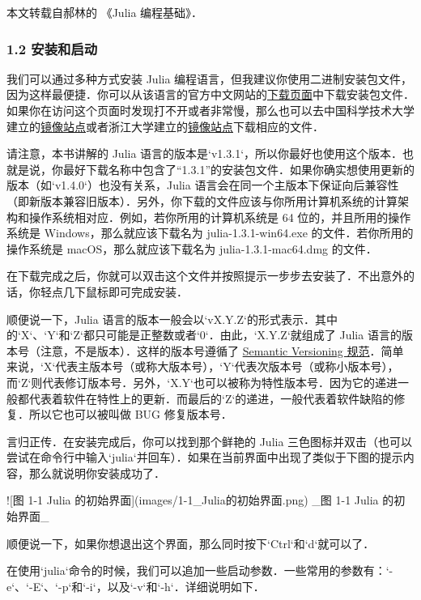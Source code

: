 
本文转载自郝林的 《Julia 编程基础》．

\subsubsection{1.2 安装和启动}

我们可以通过多种方式安装 Julia 编程语言，但我建议你使用二进制安装包文件，因为这样最便捷．你可以从该语言的官方中文网站的\href{https://cn.julialang.org/downloads/}{下载页面}中下载安装包文件．如果你在访问这个页面时发现打不开或者非常慢，那么也可以去中国科学技术大学建立的\href{https://mirrors.zju.edu.cn/julia/releases/}{镜像站点}或者浙江大学建立的\href{https://mirrors.ustc.edu.cn/julia/releases/}{镜像站点}下载相应的文件．

请注意，本书讲解的 Julia 语言的版本是`v1.3.1`，所以你最好也使用这个版本．也就是说，你最好下载名称中包含了“1.3.1”的安装包文件．如果你确实想使用更新的版本（如`v1.4.0`）也没有关系，Julia 语言会在同一个主版本下保证向后兼容性（即新版本兼容旧版本）．另外，你下载的文件应该与你所用计算机系统的计算架构和操作系统相对应．例如，若你所用的计算机系统是 64 位的，并且所用的操作系统是 Windows，那么就应该下载名为 julia-1.3.1-win64.exe 的文件．若你所用的操作系统是 macOS，那么就应该下载名为 julia-1.3.1-mac64.dmg 的文件．

在下载完成之后，你就可以双击这个文件并按照提示一步步去安装了．不出意外的话，你轻点几下鼠标即可完成安装．

顺便说一下，Julia 语言的版本一般会以`vX.Y.Z`的形式表示．其中的`X`、`Y`和`Z`都只可能是正整数或者`0`．由此，`X.Y.Z`就组成了 Julia 语言的版本号（注意，不是版本）．这样的版本号遵循了 \href{https://semver.org}{Semantic Versioning 规范}．简单来说，`X`代表主版本号（或称大版本号），`Y`代表次版本号（或称小版本号），而`Z`则代表修订版本号．另外，`X.Y`也可以被称为特性版本号．因为它的递进一般都代表着软件在特性上的更新．而最后的`Z`的递进，一般代表着软件缺陷的修复．所以它也可以被叫做 BUG 修复版本号．

言归正传．在安装完成后，你可以找到那个鲜艳的 Julia 三色图标并双击（也可以尝试在命令行中输入`julia`并回车）．如果在当前界面中出现了类似于下图的提示内容，那么就说明你安装成功了．

![图 1-1 Julia 的初始界面](images/1-1_Julia的初始界面.png)
_图 1-1 Julia 的初始界面_

顺便说一下，如果你想退出这个界面，那么同时按下`Ctrl`和`d`就可以了．

在使用`julia`命令的时候，我们可以追加一些启动参数．一些常用的参数有：`-e`、`-E`、`-p`和`-i`，以及`-v`和`-h`．详细说明如下．

